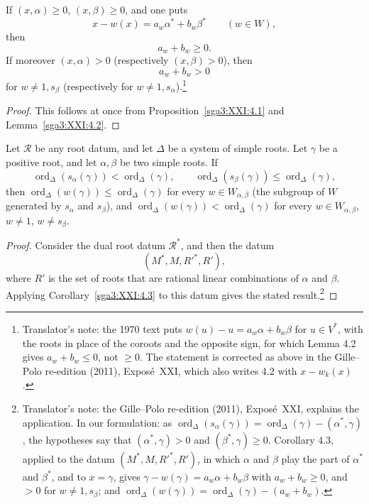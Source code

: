 \begin{corollary}\label{sga3:XXI:4.3}
If \((x,\alpha)\ge0\), \((x,\beta)\ge0\), and one puts
\[
 x-w(x)=a_w\alpha^\ast+b_w\beta^\ast\qquad(w\in W),
\]
then
\[
 a_w+b_w\ge0.
\]
If moreover \((x,\alpha)>0\) (respectively \((x,\beta)>0\)), then
\[
 a_w+b_w>0
\]
for \(w\ne1,s_\beta\) (respectively for \(w\ne1,s_\alpha\)).\footnote{Translator's
note: the 1970 text puts \(w(u)-u=a_w\alpha+b_w\beta\) for \(u\in V^\ast\), with the roots
in place of the coroots and the opposite sign, for which Lemma 4.2 gives
\(a_w+b_w\leq0\), not \(\geq0\). The statement is corrected as above in the Gille--Polo
re-edition (2011), Exposé~XXI, which also writes 4.2 with \(x-w_k(x)\).}
\end{corollary}

\begin{proof}
This follows at once from Proposition~\ref{sga3:XXI:4.1} and
Lemma~\ref{sga3:XXI:4.2}.
\end{proof}

\begin{corollary}\label{sga3:XXI:4.4}
Let \(\mathcal{R}\) be any root datum, and let \(\Delta\) be a system
of simple roots. Let \(\gamma\) be a positive root, and let \(\alpha,\beta\) be two
simple roots. If
\[
 \operatorname{ord}_\Delta(s_\alpha(\gamma))
 <\operatorname{ord}_\Delta(\gamma),
 \qquad
 \operatorname{ord}_\Delta(s_\beta(\gamma))
 \le\operatorname{ord}_\Delta(\gamma),
\]
then
\(\operatorname{ord}_\Delta(w(\gamma))\le\operatorname{ord}_\Delta(\gamma)\)
for every \(w\in W_{\alpha,\beta}\) (the subgroup of \(W\) generated by
\(s_\alpha\) and \(s_\beta\)), and
\(\operatorname{ord}_\Delta(w(\gamma))<\operatorname{ord}_\Delta(\gamma)\)
for every \(w\in W_{\alpha,\beta}\), \(w\neq1\), \(w\neq s_\beta\).
\end{corollary}

\begin{proof}
Consider the dual root datum \(\mathcal{R}^\ast\), and then the datum
\[
 (M^\ast,M,R'^\ast,R'),
\]
where \(R'\) is the set of roots that are rational linear
combinations of \(\alpha\) and \(\beta\). Applying
Corollary~\ref{sga3:XXI:4.3} to this datum gives the stated result.\footnote{Translator's note: the Gille--Polo re-edition (2011), Exposé~XXI,
explains the application. In our formulation: as
\(\operatorname{ord}_\Delta(s_\alpha(\gamma))=\operatorname{ord}_\Delta(\gamma)-(\alpha^\ast,\gamma)\),
the hypotheses say that \((\alpha^\ast,\gamma)>0\) and \((\beta^\ast,\gamma)\geq0\).
Corollary 4.3, applied to the datum \((M^\ast,M,R'^\ast,R')\), in which \(\alpha\) and
\(\beta\) play the part of \(\alpha^\ast\) and \(\beta^\ast\), and to \(x=\gamma\), gives
\(\gamma-w(\gamma)=a_w\alpha+b_w\beta\) with \(a_w+b_w\geq0\), and \(>0\) for
\(w\neq1,s_\beta\); and
\(\operatorname{ord}_\Delta(w(\gamma))=\operatorname{ord}_\Delta(\gamma)-(a_w+b_w)\).}
\end{proof}

